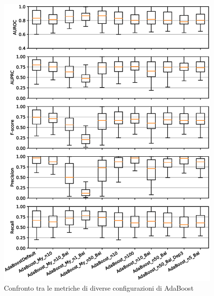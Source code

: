 \documentclass[12pt,a4paper,oneside,hidelinks]{report}
\begin{document}
\vspace*{\fill}

\begin{figure}[hb]%
    \centering
    \includegraphics[scale = 0.80]{CC-AdaBoost-level1.eps}%
    \caption{Confronto tra le metriche di diverse configurazioni di AdaBoost}%
    \label{figure:liv1.1}%
\end{figure}

\vspace*{\fill}

\vspace*{\fill}
\end{document}
